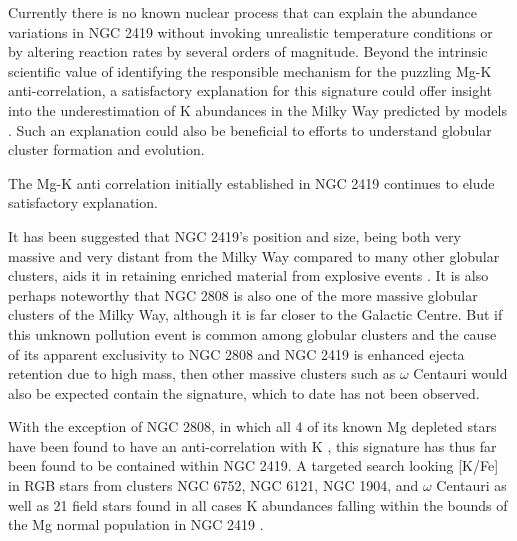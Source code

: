 \documentclass[a4paper,fleqn,usenatbib]{mnras}
\begin{document}
Currently there is no known nuclear process that can explain the abundance variations in NGC 2419 without invoking unrealistic temperature conditions or by altering reaction rates by several orders of magnitude. Beyond the intrinsic scientific value of identifying the responsible mechanism for the puzzling Mg-K anti-correlation, a satisfactory explanation for this signature could offer insight into the underestimation of K abundances in the Milky Way predicted by models \citep{kobayashi2011}. Such an explanation could also be beneficial to efforts to understand globular cluster formation and evolution.





The Mg-K anti correlation initially established in NGC 2419 continues to elude satisfactory explanation. 





It has been suggested that NGC 2419's position and size, being both very massive and very distant from the Milky Way compared to many other globular clusters, aids it in retaining enriched material from explosive events \citep{mucciarelli2012}. It is also perhaps noteworthy that NGC 2808 is also one of the more massive globular clusters of the Milky Way, although it is far closer to the Galactic Centre. But if this unknown pollution event is common among globular clusters and the cause of its apparent exclusivity to NGC 2808 and NGC 2419 is enhanced ejecta retention due to high mass, then other massive clusters such as $\omega$ Centauri would also be expected contain the signature, which to date has not been observed.


With the exception of NGC 2808, in which all 4 of its known Mg depleted stars have been found to have an anti-correlation with K \citep{mucciarelli2015}, this signature has thus far been found to be contained within NGC 2419. A  targeted search looking [K/Fe] in RGB stars from clusters NGC 6752, NGC 6121, NGC 1904, and $\omega$ Centauri as well as 21 field stars found in all cases K abundances falling within the bounds of the Mg normal population in NGC 2419 \citep{carretta2013}.
\end{document}
